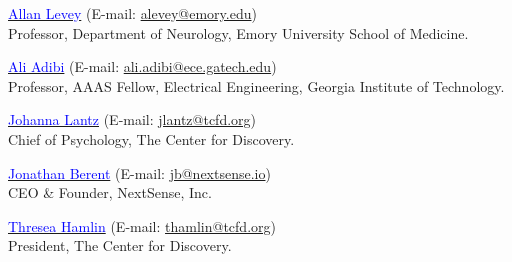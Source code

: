 \documentclass[margin, line]{res}
\newenvironment{list1}{
  \begin{list}{\ding{113}}{%
      \setlength{\itemsep}{0in}
      \setlength{\parsep}{0in} \setlength{\parskip}{0in}
      \setlength{\topsep}{0in} \setlength{\partopsep}{0in} 
      \setlength{\leftmargin}{0.17in}}}{\end{list}}
\begin{document}
\begin{resume}
\begin{list1}
\item[] \href{https://med.emory.edu/directory/profile/?u=ALEVEY}{{\textcolor{blue}{Allan Levey}}} (E-mail: \href{mailto:alevey@emory.edu}{alevey@emory.edu})\\
Professor, Department of Neurology, Emory University School of Medicine.

\item[] \href{https://sites.gatech.edu/ece-prg/people/adibi/}{{\textcolor{blue}{Ali Adibi}}} (E-mail: \href{mailto:ali.adibi@ece.gatech.edu}{ali.adibi@ece.gatech.edu})\\
Professor, AAAS Fellow, Electrical Engineering, Georgia Institute of Technology.


\item[] \href{https://thecenterfordiscovery.org/}{{\textcolor{blue}{Johanna Lantz}}} (E-mail: \href{mailto:thamlin@tcfd.org}{jlantz@tcfd.org}) \\Chief of Psychology, The Center for Discovery.

\item[] \href{https://www.linkedin.com/in/jonathan-berent-865a/}{{\textcolor{blue}{Jonathan Berent}}} (E-mail: \href{mailto:jb@nextsense.io}{jb@nextsense.io}) \\CEO \& Founder, NextSense, Inc.


\item[] \href{https://thecenterfordiscovery.org/about-us/leadership/dr-teresa-hamlin/}{{\textcolor{blue}{Thresea Hamlin}}} (E-mail: \href{mailto:thamlin@tcfd.org}{thamlin@tcfd.org}) \\President, The Center for Discovery.










\end{list1}
\end{resume}
\end{document}
